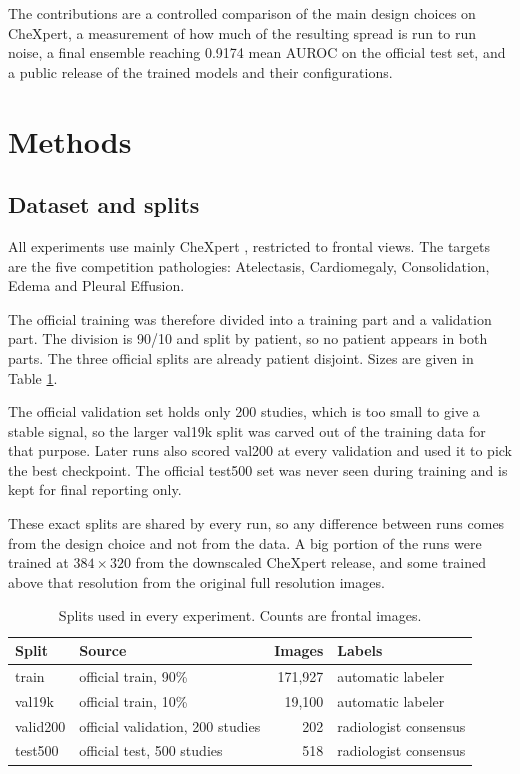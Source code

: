 \documentclass{article}
\begin{document}
The contributions are a controlled comparison of the main design choices on CheXpert, a
measurement of how much of the resulting spread is run to run noise, a final ensemble
reaching 0.9174 mean AUROC on the official test set, and a public release of the trained
models and their configurations.

\section{Methods}

\subsection{Dataset and splits}

All experiments use mainly CheXpert \cite{irvin2019chexpert}, restricted to frontal views.
The targets are the five competition pathologies: Atelectasis, Cardiomegaly,
Consolidation, Edema and Pleural Effusion.

The official training was therefore divided into a training part
and a validation part. The division is 90/10 and split by patient, so no patient
appears in both parts. The three official splits are already patient disjoint.
Sizes are given in Table \ref{tab:splits}.

The official validation set holds only 200 studies, which is too small to give a
stable signal, so the larger val19k split was carved out of the training data for
that purpose. Later runs also scored val200 at every validation and used it to pick
the best checkpoint. The official test500 set was never seen during training and is
kept for final reporting only.

These exact splits are shared by every run, so any difference between runs comes from
the design choice and not from the data. A big portion of the runs were trained at $384\times320$
from the downscaled CheXpert release, and some trained above that resolution from
the original full resolution images.

\begin{table}[H]
  \caption{Splits used in every experiment. Counts are frontal images.}
  \centering
  \begin{tabular}{llrl}
    \toprule
    Split    & Source                           & Images  & Labels                \\
    \midrule
    train    & official train, 90\%             & 171,927 & automatic labeler     \\
    val19k   & official train, 10\%             & 19,100  & automatic labeler     \\
    valid200 & official validation, 200 studies & 202     & radiologist consensus \\
    test500  & official test, 500 studies       & 518     & radiologist consensus \\
    \bottomrule
  \end{tabular}
  \label{tab:splits}
\end{table}
\end{document}
